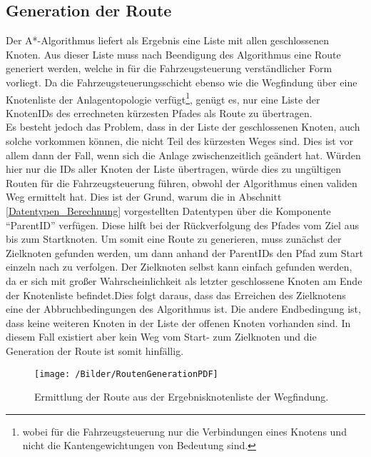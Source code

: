		\subsection{Generation der Route}
			\label{Routengeneration}
			Der A*-Algorithmus liefert als Ergebnis eine Liste mit allen geschlossenen Knoten. Aus dieser Liste muss nach Beendigung des Algorithmus eine Route generiert werden, welche in für die Fahrzeugsteuerung verständlicher Form vorliegt. Da die Fahrzeugsteuerungsschicht ebenso wie die Wegfindung über eine Knotenliste der Anlagentopologie verfügt\footnote{wobei für die Fahrzeugsteuerung nur die Verbindungen eines Knotens und nicht die Kantengewichtungen von  Bedeutung sind.}, genügt es, nur eine Liste der KnotenIDs des errechneten kürzesten Pfades als Route zu übertragen.
			\\[4pt]
			Es besteht jedoch das Problem, dass in der Liste der geschlossenen Knoten, auch solche vorkommen können, die nicht Teil des kürzesten Weges sind. Dies ist vor allem dann der Fall, wenn sich die Anlage zwischenzeitlich geändert hat. Würden hier nur die IDs aller Knoten der Liste übertragen, würde dies zu ungültigen Routen für die Fahrzeugsteuerung führen, obwohl der Algorithmus einen validen Weg ermittelt hat. Dies ist der Grund, warum die in Abschnitt \ref{Datentypen_Berechnung} vorgestellten Datentypen über die Komponente "`ParentID"' verfügen. Diese hilft bei der Rückverfolgung des Pfades vom Ziel aus bis zum Startknoten. Um somit eine Route zu generieren, muss zunächst der Zielknoten gefunden werden, um dann anhand der ParentIDs den Pfad zum Start einzeln nach zu verfolgen. Der Zielknoten selbst kann einfach gefunden werden, da er sich mit großer Wahrscheinlichkeit als letzter geschlossene Knoten am Ende der Knotenliste befindet.Dies folgt daraus, dass das Erreichen des Zielknotens eine der Abbruchbedingungen des Algorithmus ist. Die andere Endbedingung ist, dass keine weiteren Knoten in der Liste der offenen Knoten vorhanden sind. In diesem Fall existiert aber kein Weg vom Start- zum Zielknoten und die Generation der Route ist somit hinfällig.
			
			\begin{figure}[h]
				\centering
				\texttt{[image: /Bilder/RoutenGenerationPDF]}
				\vspace{0.2cm}
				\caption{Ermittlung der Route aus der Ergebnisknotenliste der Wegfindung.}\label{GenerateRoute}
			\end{figure}
			
